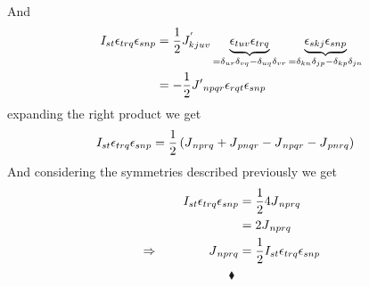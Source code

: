 And
\begin{align}
I_{st}\epsilon_{trq}\epsilon_{snp} &= \frac{1}{2} J^{'}_{kjuv} \underbrace{\epsilon_{tuv}\epsilon_{trq}}_{= \delta_{ur}\delta_{vq}-\delta_{uq}\delta_{vr}}\underbrace{\epsilon_{skj}\epsilon_{snp}}_{= \delta_{kn}\delta_{jp}-\delta_{kp}\delta_{jn}}\\
&= -\frac{1}{2} J{'}_{npqr} \epsilon_{rqt}\epsilon_{snp}
\end{align}
expanding the right product we get
\begin{align}
I_{st}\epsilon_{trq}\epsilon_{snp} &= \frac{1}{2} \left( J{}_{nprq} +J{}_{pnqr}-J{}_{npqr}-J{}_{pnrq}\right)
\end{align}
And considering the symmetries described previously we get
\begin{align}
I_{st}\epsilon_{trq}\epsilon_{snp} &= \frac{1}{2} 4 J{}_{nprq}\\
&= 2 J{}_{nprq}\\
\Rightarrow \quad\quad\quad\quad J{}_{nprq}&= \frac{1}{2} I_{st}\epsilon_{trq}\epsilon_{snp} 
\end{align}
$$\blacklozenge$$
\newpage